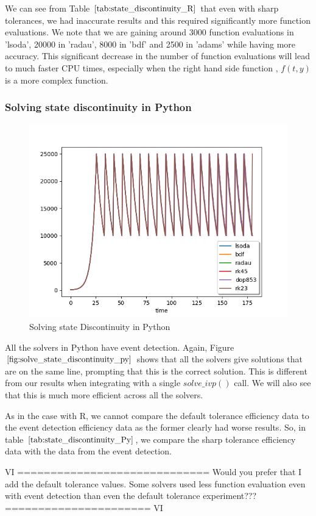 We can see from Table $\ref{tab:state_discontinuity_R}$ that even with sharp tolerances, we had inaccurate results and this required significantly more function evaluations. We note that we are gaining around 3000 function evaluations in 'lsoda', 20000 in 'radau', 8000 in 'bdf' and 2500 in 'adams' while having more accuracy. This significant decrease in the number of function evaluations will lead to much faster CPU times, especially when the right hand side function , $f(t, y)$ is a more complex function.

\subsubsection{Solving state discontinuity in Python}
\begin{figure}[h]
	\centering
	\includegraphics[width=0.7\linewidth]{./figures/solve_state_discontinuity_py}
	\caption{Solving state Discontinuity in Python}
	\label{fig:solve_state_discontinuity_py}
\end{figure}
All the solvers in Python have event detection. Again, Figure $\ref{fig:solve_state_discontinuity_py}$ shows that all the solvers give solutions that are on the same line, prompting that this is the correct solution. This is different from our results when integrating with a single $solve\_ivp()$ call. We will also see that this is much more efficient across all the solvers.

As in the case with R, we cannot compare the default tolerance efficiency data to the event detection efficiency data as the former clearly had worse results. So, in table $\ref{tab:state_discontinuity_Py}$, we compare the sharp tolerance efficiency data with the data from the event detection.

VI =============================
Would you prefer that I add the default tolerance values. Some solvers used less function evaluation even with event detection than even the default tolerance experiment???
====================== VI

